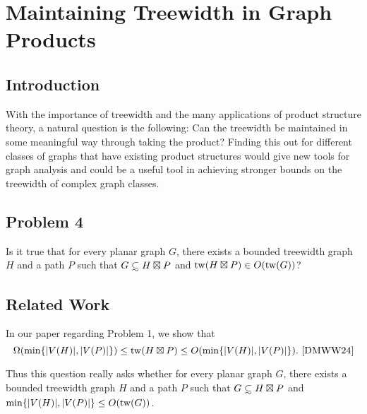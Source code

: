 \documentclass[../main.tex]{subfiles}
\begin{document}
	
	\section{Maintaining Treewidth in Graph Products}
	\subsection{Introduction}
	With the importance of treewidth and the many applications of product structure theory, a natural question is the following: Can the treewidth be maintained in some meaningful way through taking the product? Finding this out for different classes of graphs that have existing product structures would give new tools for graph analysis and could be a useful tool in achieving stronger bounds on the treewidth of complex graph classes. 
	\subsection{Problem 4}
	  Is it true that for every planar graph $G$, there exists a bounded treewidth graph $H$ and a path $P$ such that $G \subsetsim H\boxtimes P$ and $\operatorname{tw}(H\boxtimes P) \in O(\operatorname{tw}(G))$? 
	
	\subsection{Related Work}
	In our paper regarding Problem 1, we show that $$\Omega(\min\{|V(H)|,|V(P)|\})\leq  \tw( H\boxtimes P) \leq O(\min\{|V(H)|,|V(P)|\}).~\text{\cite[Lemma~3, Equation~(2)]{DMWW24}}$$ 
	
	Thus this question really asks whether for every planar graph $G$, there exists a bounded treewidth graph $H$ and a path $P$ such that $G\subsetsim H\boxtimes P$ and $\min\{|V(H)|,|V(P)|\} \leq O(\operatorname{tw}(G))$. 
	
	
	
\end{document}
